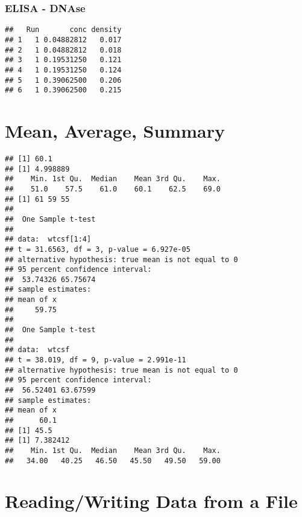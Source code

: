 \documentclass[a4paper,10pt]{book}\usepackage[]{graphicx}\usepackage[]{color}
\makeatletter
\newenvironment{kframe}{%
 \def\at@end@of@kframe{}%
 \ifinner\ifhmode%
  \def\at@end@of@kframe{\end{minipage}}%
  \begin{minipage}{\columnwidth}%
 \fi\fi%
 \def\FrameCommand##1{\hskip\@totalleftmargin \hskip-\fboxsep
 \colorbox{shadecolor}{##1}\hskip-\fboxsep
     \hskip-\linewidth \hskip-\@totalleftmargin \hskip\columnwidth}%
 \MakeFramed {\advance\hsize-\width
   \@totalleftmargin\z@ \linewidth\hsize
   \@setminipage}}%
 {\par\unskip\endMakeFramed%
 \at@end@of@kframe}
\newenvironment{knitrout}{}{} %
\makeatother
\begin{document}
\subsubsection*{ELISA - DNAse}

\begin{knitrout}
\color{fgcolor}\begin{kframe}
\begin{verbatim}
##   Run       conc density
## 1   1 0.04882812   0.017
## 2   1 0.04882812   0.018
## 3   1 0.19531250   0.121
## 4   1 0.19531250   0.124
## 5   1 0.39062500   0.206
## 6   1 0.39062500   0.215
\end{verbatim}
\end{kframe}
\end{knitrout}


\section*{Mean, Average, Summary}

\begin{knitrout}
\color{fgcolor}\begin{kframe}
\begin{verbatim}
## [1] 60.1
## [1] 4.998889
##    Min. 1st Qu.  Median    Mean 3rd Qu.    Max. 
##    51.0    57.5    61.0    60.1    62.5    69.0
## [1] 61 59 55
## 
## 	One Sample t-test
## 
## data:  wtcsf[1:4]
## t = 31.6563, df = 3, p-value = 6.927e-05
## alternative hypothesis: true mean is not equal to 0
## 95 percent confidence interval:
##  53.74326 65.75674
## sample estimates:
## mean of x 
##     59.75
## 
## 	One Sample t-test
## 
## data:  wtcsf
## t = 38.019, df = 9, p-value = 2.991e-11
## alternative hypothesis: true mean is not equal to 0
## 95 percent confidence interval:
##  56.52401 63.67599
## sample estimates:
## mean of x 
##      60.1
## [1] 45.5
## [1] 7.382412
##    Min. 1st Qu.  Median    Mean 3rd Qu.    Max. 
##   34.00   40.25   46.50   45.50   49.50   59.00
\end{verbatim}
\end{kframe}
\end{knitrout}

\section*{Reading/Writing Data from a File}
\end{document}
